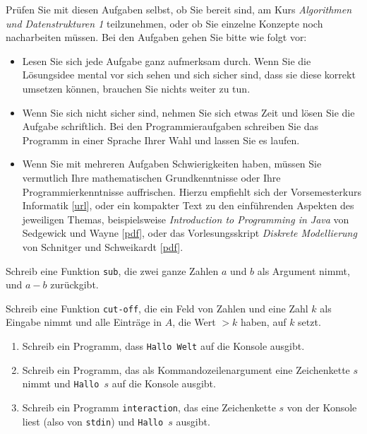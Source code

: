 \documentclass{uebung_cs}
\begin{document}
Prüfen Sie mit diesen Aufgaben selbst, ob Sie bereit sind, am Kurs \emph{Algorithmen und Datenstrukturen 1} teilzunehmen, oder ob Sie einzelne Konzepte noch nacharbeiten müssen.
Bei den Aufgaben gehen Sie bitte wie folgt vor:
\begin{itemize}
    \item Lesen Sie sich jede Aufgabe ganz aufmerksam durch. Wenn Sie die Lösungsidee mental vor sich sehen und sich sicher sind, dass sie diese korrekt umsetzen können, brauchen Sie nichts weiter zu tun.
    \item Wenn Sie sich nicht sicher sind, nehmen Sie sich etwas Zeit und lösen Sie die Aufgabe schriftlich. Bei den Programmieraufgaben schreiben Sie das Programm in einer Sprache Ihrer Wahl und lassen Sie es laufen.
    \item Wenn Sie mit mehreren Aufgaben Schwierigkeiten haben, müssen Sie vermutlich Ihre mathematischen Grundkenntnisse oder Ihre Programmierkenntnisse auffrischen. Hierzu empfiehlt sich der Vorsemesterkurs Informatik [\href{http://www-stud.informatik.uni-frankfurt.de/~lz_inf/Vorkurs/WS2021/webseite.html}{url}], oder ein kompakter Text zu den einführenden Aspekten des jeweiligen Themas, beispielsweise \emph{Introduction to Programming in Java} von Sedgewick und Wayne [\href{https://introcs.cs.princeton.edu/java/home/chapter1.pdf}{pdf}], oder das Vorlesungsskript \emph{Diskrete Modellierung} von Schnitger und Schweikardt [\href{http://algo.cs.uni-frankfurt.de/lehre/dismod/material/skript1920.pdf}{pdf}].
\end{itemize}

\begin{aufgabe}[Subtraktion]
    Schreib eine Funktion \texttt{sub}, die zwei ganze Zahlen $a$ und $b$ als Argument nimmt, und $a-b$ zurückgibt.
\end{aufgabe}

\begin{aufgabe}
    Schreib eine Funktion \texttt{cut-off}, die ein Feld von Zahlen und eine Zahl $k$ als Eingabe nimmt und alle Einträge in $A$, die Wert $>k$ haben, auf $k$ setzt.
\end{aufgabe}

\begin{aufgabe}\mbox{}
    \begin{enumerate}
        \item Schreib ein Programm, dass \texttt{Hallo Welt} auf die Konsole ausgibt.
        \item Schreib ein Programm, das als Kommandozeilenargument eine Zeichenkette $s$ nimmt und \texttt{Hallo $s$} auf die Konsole ausgibt.
        \item Schreib ein Programm \texttt{interaction}, das eine Zeichenkette $s$ von der Konsole liest (also von \texttt{stdin}) und \texttt{Hallo $s$} ausgibt.
    \end{enumerate}
\end{aufgabe}
\end{document}

